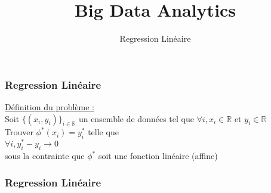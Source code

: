 \documentclass{formation}
\title{Big Data Analytics}
\subtitle{Regression Linéaire}
\begin{document}
\maketitle

\begin{frame}
  \frametitle{Regression Linéaire}
  \underline{Définition du problème :}\\
  \newline
  Soit $\{( x_i , y_i)\}_{i \in \mathbb{R}}$ un ensemble de données tel que $\forall i, x_i \in \mathbb{R}$ et $y_i \in \mathbb{R}$ \\
  \newline
  Trouver $\phi^*(x_i) = y_i^*$ telle que \\
  \newline
  $\forall i, y^*_i-y_i \rightarrow 0$ \\
  sous la contrainte que $\phi^*$ soit une fonction linéaire (affine)
\end{frame}

\begin{frame}
  \frametitle{Regression Linéaire}
\end{frame}
\end{document}
